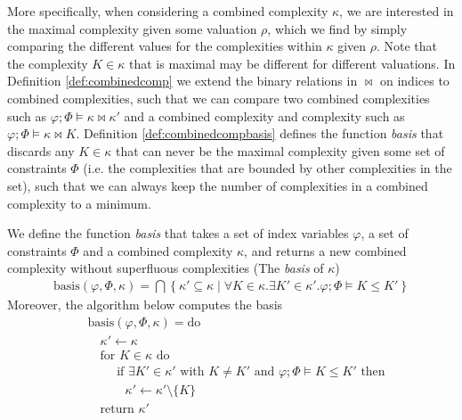 More specifically, when considering a combined complexity $\kappa$, we are interested in the maximal complexity given some valuation $\rho$, which we find by simply comparing the different values for the complexities within $\kappa$ given $\rho$. Note that the complexity $K \in \kappa$ that is maximal may be different for different valuations. In Definition \ref{def:combinedcomp} we extend the binary relations in $\bowtie$ on indices to combined complexities, such that we can compare two combined complexities such as $\varphi;\Phi \vDash \kappa \bowtie \kappa'$ and a combined complexity and complexity such as $\varphi;\Phi \vDash \kappa \bowtie K$. Definition \ref{def:combinedcompbasis} defines the function \textit{basis} that discards any $K \in \kappa$ that can never be the maximal complexity given some set of constraints $\Phi$ (i.e. the complexities that are bounded by other complexities in the set), such that we can always keep the number of complexities in a combined complexity to a minimum. %
%
\begin{definition}\label{def:combinedcompbasis}
    We define the function \textit{basis} that takes a set of index variables $\varphi$, a set of constraints $\Phi$ and a combined complexity $\kappa$, and returns a new combined complexity without superfluous complexities (The \textit{basis} of $\kappa$)
    \begin{align*}
        \text{basis}(\varphi,\Phi,\kappa) = \bigcap\left\{ \kappa' \subseteq \kappa \mid \forall K\in\kappa.\exists K'\in\kappa'.\varphi;\Phi\vDash K \leq K' \right\}
    \end{align*}
    Moreover, the algorithm below computes the basis
    \begin{align*}
        &\text{basis}(\varphi, \Phi, \kappa) = \text{do}\\[-0.5em]
        &\quad \kappa' \leftarrow \kappa\\[-0.5em]
        &\quad \text{for } K \in \kappa \text{ do}\\[-0.5em]
        &\quad\quad \text{ if } \exists K' \in \kappa' \text{ with } K \not = K' \text{ and } \varphi;\Phi \vDash K \leq K' \text{ then}\\[-0.5em]
        &\quad\quad\quad \kappa' \leftarrow \kappa' \setminus \{K\}\\[-0.5em]
        &\quad \text{return } \kappa'
    \end{align*}
\end{definition}
%

